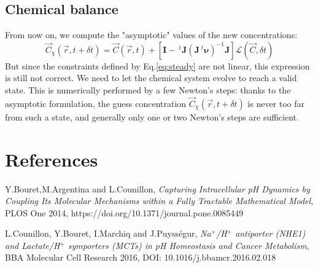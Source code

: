 \documentclass[aps,11pt]{revtex4}
\begin{document}
\subsection{Chemical balance}
From now on, we compute the "asymptotic" values of the new concentrations:
\begin{equation}
\vec{C}_\chi(\vec{r},t+\delta t) = \vec{C}(\vec{r},t) + \left[\bm{I} - ~^t\bm{J}\left(\bm{J}~^t\bm{\nu}\right)^{-1} \bm{J}\right] \mathcal{L}(\vec{C},\delta t)
\end{equation}  
But since the constraints defined by Eq.\eqref{eq:steady} are not linear, this expression is still not correct.
We need to let the chemical system evolve to reach a valid state. 
This is numerically performed by a few Newton's steps: thanks to the asymptotic formulation, the guess concentration $\vec{C}_\chi(\vec{r},t+\delta t)$ is never too far from such a state, and generally only one or two Newton's steps are sufficient.
  
\section{References}
\begin{thebibliography}{1}

	Y.Bouret,M.Argentina and L.Counillon,
	\textit{Capturing Intracellular pH Dynamics by Coupling Its Molecular Mechanisms within a Fully Tractable Mathematical Model},
	PLOS One 2014,
	https://doi.org/10.1371/journal.pone.0085449


	L.Counillon, Y.Bouret, I.Marchiq and J.Puyss\'egur,
	\textit{{Na$^+$/H$^+$ antiporter (NHE1) and Lactate/H$^+$ symporters (MCTs)
	 in pH Homeostasis and Cancer Metabolism}},
	 BBA Molecular Cell Research 2016,
	 DOI: 10.1016/j.bbamcr.2016.02.018

\end{thebibliography}
\end{document}
